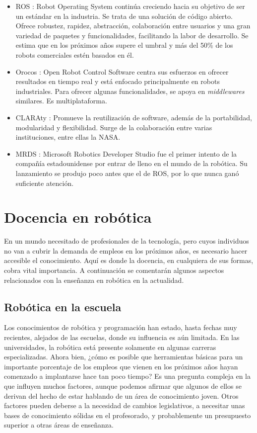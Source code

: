 \documentclass[12pt,spanish,chapterprefix, numbers=noenddot]{book}
\numberwithin{equation}{section}
\numberwithin{figure}{section}
\begin{document}
\begin{itemize}
\item ROS \cite{ros}: Robot Operating System continúa creciendo hacia su objetivo de ser un estándar en la industria. Se trata de una solución de código abierto. Ofrece robustez, rapidez, abstracción, colaboración entre usuarios y una gran variedad de paquetes y funcionalidades, facilitando la labor de desarrollo. Se estima que en los próximos años supere el umbral y más del 50\% de los robots comerciales estén basados en él. 
\item Orocos \cite{orocos}: Open Robot Control Software centra sus esfuerzos en ofrecer resultados en tiempo real y está enfocado principalmente en robots industriales. Para ofrecer algunas funcionalidades, se apoya en \textit{middlewares} similares. Es multiplataforma.  
\item CLARAty \cite{claraty}: Promueve la reutilización de software, además de la portabilidad, modularidad y flexibilidad. Surge de la colaboración entre varias instituciones, entre ellas la NASA.
\item MRDS \cite{mrds}: Microsoft Robotics Developer Studio fue el primer intento de la compañía estadounidense por entrar de lleno en el mundo de la robótica. Su lanzamiento se produjo poco antes que el de ROS, por lo que nunca ganó suficiente atención. 
\end{itemize}

\section{Docencia en robótica}
En un mundo necesitado de profesionales de la tecnología, pero cuyos individuos no van a cubrir la demanda de empleos en los próximos años, es necesario hacer accesible el conocimiento. Aquí es donde la docencia, en cualquiera de sus formas, cobra vital importancia. A continuación se comentarán algunos aspectos relacionados con la enseñanza en robótica en la actualidad. 
\subsection{Robótica en la escuela}
Los conocimientos de robótica y programación han estado, hasta fechas muy recientes, alejados de las escuelas, donde  su influencia es aún limitada. En las universidades,  la robótica está presente solamente en algunas carreras especializadas. Ahora bien, ¿cómo es posible que herramientas básicas para un importante porcentaje de los empleos que vienen en los próximos años hayan comenzado a implantarse hace tan poco tiempo?  \cite{noticia_estudiantes} Es una pregunta compleja en la que influyen muchos factores, aunque podemos afirmar que algunos de ellos se derivan del hecho de estar hablando de un área de conocimiento joven. Otros factores pueden deberse a la necesidad de cambios legislativos, a necesitar unas bases de conocimiento sólidas en el profesorado, y probablemente un presupuesto superior a otras áreas de enseñanza. 
\end{document}
